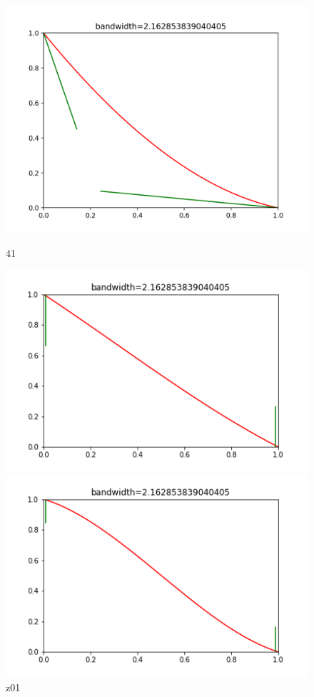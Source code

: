 \documentclass[a4 paper,12pt]{article}
\begin{document}
\begin{figure}
	\centering
	\includegraphics[scale=0.45]{case41_frame0000035.png}
	\caption*{41}
	\includegraphics[scale=0.49]{casez01_frame0000035.png}
	\caption*{z01}
	\includegraphics[scale=0.49]{casez11_frame0000035.png}

\end{figure}
\end{document}
